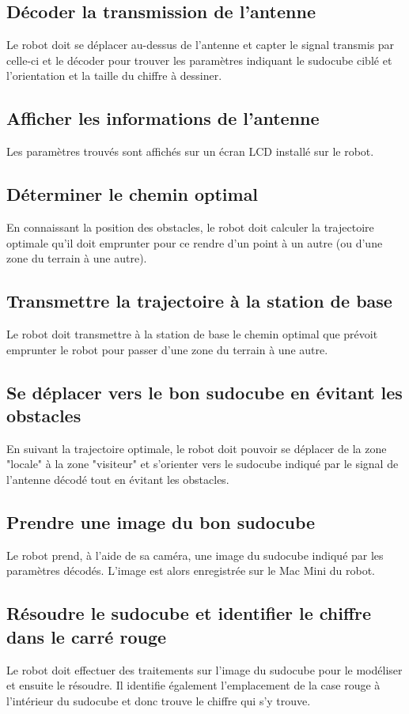 \subsection{Décoder la transmission de l'antenne}
Le robot doit se déplacer au-dessus de l'antenne et capter le signal transmis par celle-ci et le décoder pour trouver les paramètres indiquant le sudocube ciblé et l'orientation et la taille du chiffre à dessiner. 
\subsection{Afficher les informations de l'antenne}
Les paramètres trouvés sont affichés sur un écran LCD installé sur le robot.
\subsection{Déterminer le chemin optimal}
En connaissant la position des obstacles, le robot doit calculer la trajectoire optimale qu'il doit emprunter pour ce rendre d'un point à un autre (ou d'une zone du terrain à une autre).
\subsection{Transmettre la trajectoire à la station de base}
Le robot doit transmettre à la station de base le chemin optimal que prévoit emprunter le robot pour passer d'une zone du terrain à une autre.
\subsection{Se déplacer vers le bon sudocube en évitant les obstacles}
En suivant la trajectoire optimale, le robot doit pouvoir se déplacer de la zone "locale" à la zone "visiteur" et s'orienter vers le sudocube indiqué par le signal de l'antenne décodé tout en évitant les obstacles.
\subsection{Prendre une image du bon sudocube}
Le robot prend, à l'aide de sa caméra, une image du sudocube indiqué par les paramètres décodés. L'image est alors enregistrée sur le Mac Mini du robot.
\subsection{Résoudre le sudocube et identifier le chiffre dans le carré rouge}
Le robot doit effectuer des traitements sur l'image du sudocube pour le modéliser et ensuite le résoudre. Il identifie également l'emplacement de la case rouge à l'intérieur du sudocube et donc trouve le chiffre qui s'y trouve.
